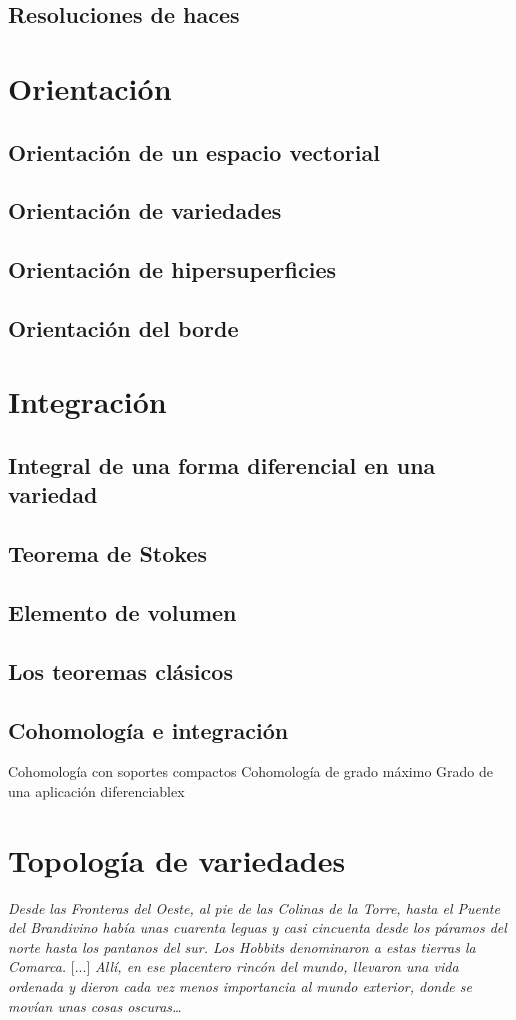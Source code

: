 \documentclass[12pt,a4paper]{book}
\theoremstyle{definition} \newtheorem{defn}[thm]{Definición}
\theoremstyle{definition} \newtheorem{ejemplo}[thm]{Ejemplo}
\theoremstyle{definition} \newtheorem{ejercicio}[thm]{Ejercicio}
\theoremstyle{remark} \newtheorem*{obs}{Observación}
\begin{document}
	  \section{Resoluciones de haces}
	  \chapter{Orientación}
	  \section{Orientación de un espacio vectorial}
	  \section{Orientación de variedades}
	  \section{Orientación de hipersuperficies}
	  \section{Orientación del borde}
	  \chapter{Integración}
	  \section{Integral de una forma diferencial en una variedad}
	  \section{Teorema de Stokes}
	  \section{Elemento de volumen}
	  \section{Los teoremas clásicos}
	  \section{Cohomología e integración}
	  Cohomología con soportes compactos
	  Cohomología de grado máximo
	  Grado de una aplicación diferenciablex

	  
	  \appendix
	  \chapter{Topología de variedades}
	  \epigraph{\textit{Desde las Fronteras del Oeste, al pie de las Colinas de la Torre, hasta el Puente del Brandivino había unas cuarenta leguas y casi cincuenta desde los páramos del norte hasta los pantanos del sur. Los Hobbits denominaron a estas tierras la Comarca.} [...] \textit{Allí, en ese placentero rincón del mundo, llevaron una vida ordenada y dieron cada vez menos importancia al mundo exterior, donde se movían unas cosas oscuras\dots}}{}
\end{document}
